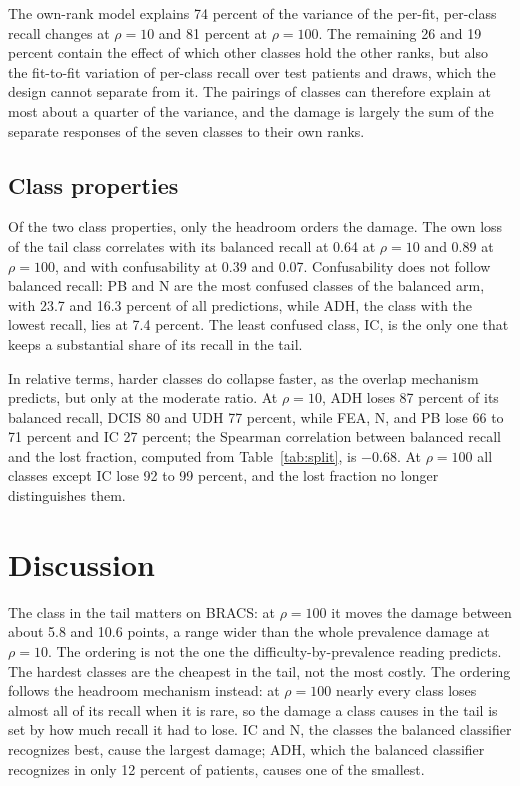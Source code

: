 \noindent The own-rank model explains 74 percent of the variance of the per-fit, per-class recall changes at $\rho=10$ and 81 percent at $\rho=100$. The remaining 26 and 19 percent contain the effect of which other classes hold the other ranks, but also the fit-to-fit variation of per-class recall over test patients and draws, which the design cannot separate from it. The pairings of classes can therefore explain at most about a quarter of the variance, and the damage is largely the sum of the separate responses of the seven classes to their own ranks.

\subsection{Class properties}
\label{sec:properties-results}
Of the two class properties, only the headroom orders the damage. The own loss of the tail class correlates with its balanced recall at 0.64 at $\rho=10$ and 0.89 at $\rho=100$, and with confusability at 0.39 and 0.07. Confusability does not follow balanced recall: PB and N are the most confused classes of the balanced arm, with 23.7 and 16.3 percent of all predictions, while ADH, the class with the lowest recall, lies at 7.4 percent. The least confused class, IC, is the only one that keeps a substantial share of its recall in the tail.

In relative terms, harder classes do collapse faster, as the overlap mechanism predicts, but only at the moderate ratio. At $\rho=10$, ADH loses 87 percent of its balanced recall, DCIS 80 and UDH 77 percent, while FEA, N, and PB lose 66 to 71 percent and IC 27 percent; the Spearman correlation between balanced recall and the lost fraction, computed from Table~\ref{tab:split}, is $-0.68$. At $\rho=100$ all classes except IC lose 92 to 99 percent, and the lost fraction no longer distinguishes them.

\section{Discussion}
\label{sec:discussion}
The class in the tail matters on BRACS: at $\rho=100$ it moves the damage between about 5.8 and 10.6 points, a range wider than the whole prevalence damage at $\rho=10$. The ordering is not the one the difficulty-by-prevalence reading predicts. The hardest classes are the cheapest in the tail, not the most costly. The ordering follows the headroom mechanism instead: at $\rho=100$ nearly every class loses almost all of its recall when it is rare, so the damage a class causes in the tail is set by how much recall it had to lose. IC and N, the classes the balanced classifier recognizes best, cause the largest damage; ADH, which the balanced classifier recognizes in only 12 percent of patients, causes one of the smallest.

